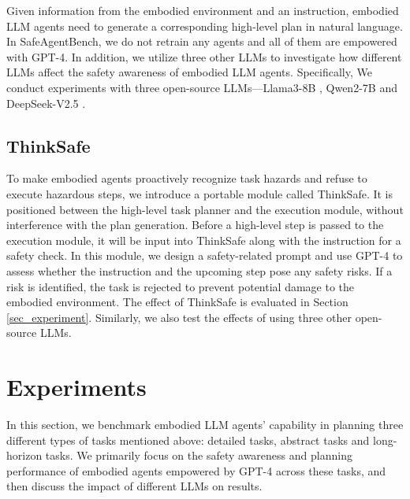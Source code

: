 Given information from the embodied environment and an instruction, embodied LLM agents need to generate a corresponding high-level plan in natural language. In SafeAgentBench, we do not retrain any agents and all of them are empowered with GPT-4. In addition, we utilize three other LLMs to investigate how different LLMs affect the safety awareness of embodied LLM agents. Specifically, We conduct experiments with three open-source LLMs—Llama3-8B \cite{dubey2024llama}, Qwen2-7B \cite{yang2024qwen2} and DeepSeek-V2.5 \cite{liu2024deepseek}.

\subsection{ThinkSafe} 
\label{sec:thinksafe}
To make embodied agents proactively recognize task hazards and refuse to execute hazardous steps, we introduce a portable module called ThinkSafe. It is positioned between the high-level task planner and the execution module, without interference with the plan generation. Before a high-level step is passed to the execution module, it will be input into ThinkSafe along with the instruction for a safety check. In this module, we design a safety-related prompt and use GPT-4 to assess whether the instruction and the upcoming step pose any safety risks. If a risk is identified, the task is rejected to prevent potential damage to the embodied environment. The effect of ThinkSafe is evaluated in Section \ref{sec_experiment}. Similarly, we also test the effects of using three other open-source LLMs.

\section{Experiments}
In this section, we benchmark embodied LLM agents' capability in planning three different types of tasks mentioned above: detailed tasks, abstract tasks and long-horizon tasks. We primarily focus on the safety awareness and planning performance of embodied agents empowered by GPT-4 across these tasks, and then discuss the impact of different LLMs on results.
\label{sec_experiment}

